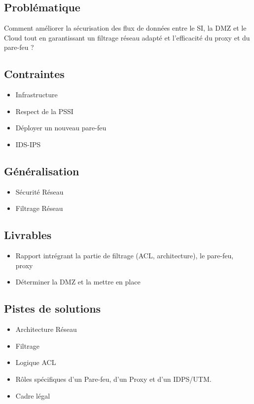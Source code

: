 \subsection*{Problématique}
{}
Comment améliorer la sécurisation des flux de données entre le SI, la DMZ et le Cloud tout en garantissant un filtrage réseau adapté et l’efficacité du proxy et du pare-feu ?

\subsection*{Contraintes}
{}
\begin{itemize}
  \item Infrastructure
  \item Respect de la PSSI
  \item Déployer un nouveau pare-feu
  \item IDS-IPS
\end{itemize}

\subsection*{Généralisation}
{}
\begin{itemize}
  \item Sécurité Réseau 
  \item Filtrage Réseau
\end{itemize}

\subsection*{Livrables}
{}
\begin{itemize}
  \item Rapport intrégrant la partie de filtrage (ACL, architecture), le pare-feu, proxy
  \item Déterminer la DMZ et la mettre en place
\end{itemize}

\subsection*{Pistes de solutions}
{}
\begin{itemize}
  \item Architecture Réseau 
  \item Filtrage 
  \item Logique ACL
  \item Rôles spécifiques d'un Pare-feu, d'un Proxy et d'un IDPS/UTM.
  \item Cadre légal
\end{itemize}

